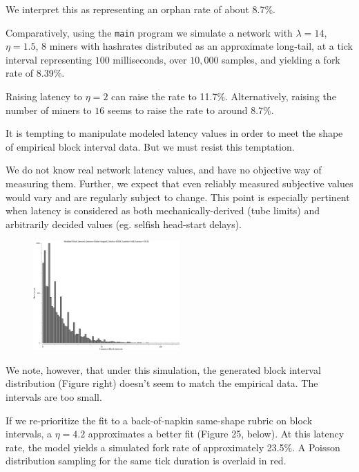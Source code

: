 \documentclass[11pt]{article}
\theoremstyle{plain}
\begin{document}
{We interpret this as representing an orphan rate of about 8.7\%. 

Comparatively, using the \texttt{main} program we simulate a network with
$\lambda=14$, $\eta=1.5$, $8$ miners with hashrates distributed as an
approximate long-tail, at a tick interval representing $100$ milliseconds, over
$10,000$ samples, and yielding a fork rate of 8.39\%. 

Raising latency to $\eta=2$ can raise the rate to 11.7\%.
Alternatively, raising the number of miners to $16$ seems to raise the rate to
around 8.7\%.

It is tempting to manipulate modeled latency values in order to meet the
shape of empirical block interval data. But we must resist this temptation.

We do not know real network latency values, and have no objective way of
measuring them. Further, we expect that even reliably measured subjective values
would vary and are regularly subject to change. This point is especially
pertinent when latency is considered as both mechanically-derived (tube limits) and
arbitrarily decided values (eg. selfish head-start delays).

\begin{figure}
    \centering
    \includegraphics[width=0.5\textwidth]{imgs/sim_a_anteater.png}
\end{figure}

We note, however, that under this simulation, the generated block interval
distribution (Figure right) doesn't seem to match the empirical data.
The intervals are too small.

If we re-prioritize the fit to a back-of-napkin same-shape rubric on block
intervals, a $\eta=4.2$ approximates a better fit (Figure 25, below). At this
latency rate, the model yields a simulated fork rate of approximately 23.5\%.
A Poisson distribution sampling for the same tick duration is overlaid in red.

}
\end{document}
